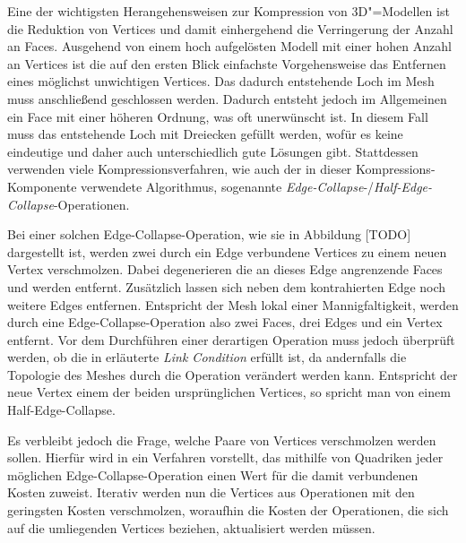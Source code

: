 Eine der wichtigsten Herangehensweisen zur Kompression von 3D"=Modellen ist die Reduktion von Vertices und damit einhergehend die Verringerung der Anzahl an Faces. Ausgehend von einem hoch aufgelösten Modell mit einer hohen Anzahl an Vertices ist die auf den ersten Blick einfachste Vorgehensweise das Entfernen eines möglichst unwichtigen Vertices. Das dadurch entstehende Loch im Mesh muss anschließend geschlossen werden. Dadurch entsteht jedoch im Allgemeinen ein Face mit einer höheren Ordnung, was oft unerwünscht ist. In diesem Fall muss das entstehende Loch mit Dreiecken gefüllt werden, wofür es keine eindeutige und daher auch unterschiedlich gute Lösungen gibt. Stattdessen verwenden viele Kompressionsverfahren, wie auch der in dieser Kompressions-Komponente verwendete Algorithmus, sogenannte \emph{Edge-Collapse}-/\emph{Half-Edge-Collapse}-Operationen.

Bei einer solchen Edge-Collapse-Operation, wie sie in Abbildung [TODO] dargestellt ist, werden zwei durch ein Edge verbundene Vertices zu einem neuen Vertex verschmolzen. Dabei degenerieren die an dieses Edge angrenzende Faces und werden entfernt. Zusätzlich lassen sich neben dem kontrahierten Edge noch weitere Edges entfernen. Entspricht der Mesh lokal einer Mannigfaltigkeit, werden durch eine Edge-Collapse-Operation also zwei Faces, drei Edges und ein Vertex entfernt. Vor dem Durchführen einer derartigen Operation muss jedoch überprüft werden, ob die in \cite[S.~118f]{botsch2010} erläuterte \emph{Link Condition} erfüllt ist, da andernfalls die Topologie des Meshes durch die Operation verändert werden kann. Entspricht der neue Vertex einem der beiden ursprünglichen Vertices, so spricht man von einem Half-Edge-Collapse.

Es verbleibt jedoch die Frage, welche Paare von Vertices verschmolzen werden sollen. Hierfür wird in \cite{garland1997} ein Verfahren vorstellt, das mithilfe von Quadriken jeder möglichen Edge-Collapse-Operation einen Wert für die damit verbundenen Kosten zuweist. Iterativ werden nun die Vertices aus Operationen mit den geringsten Kosten verschmolzen, woraufhin die Kosten der Operationen, die sich auf die umliegenden Vertices beziehen, aktualisiert werden müssen.

